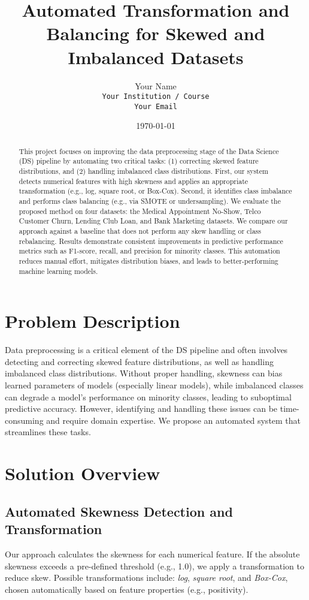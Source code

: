 \documentclass[11pt]{article}
\title{Automated Transformation and Balancing for Skewed and Imbalanced Datasets}
\author{Your Name \\
        \texttt{Your Institution / Course}\\
        \texttt{Your Email}}
\date{\today}
\begin{document}
\maketitle

\begin{abstract}
This project focuses on improving the data preprocessing stage of the Data Science (DS) pipeline by automating two critical tasks: (1) correcting skewed feature distributions, and (2) handling imbalanced class distributions. 
First, our system detects numerical features with high skewness and applies an appropriate transformation (e.g., log, square root, or Box-Cox). 
Second, it identifies class imbalance and performs class balancing (e.g., via SMOTE or undersampling). 
We evaluate the proposed method on four datasets: the Medical Appointment No-Show, Telco Customer Churn, Lending Club Loan, and Bank Marketing datasets. 
We compare our approach against a baseline that does not perform any skew handling or class rebalancing. 
Results demonstrate consistent improvements in predictive performance metrics such as F1-score, recall, and precision for minority classes. 
This automation reduces manual effort, mitigates distribution biases, and leads to better-performing machine learning models.
\end{abstract}

\section{Problem Description}
Data preprocessing is a critical element of the DS pipeline and often involves detecting and correcting skewed feature distributions, as well as handling imbalanced class distributions. 
Without proper handling, skewness can bias learned parameters of models (especially linear models), 
while imbalanced classes can degrade a model’s performance on minority classes, leading to suboptimal predictive accuracy. 
However, identifying and handling these issues can be time-consuming and require domain expertise. 
We propose an automated system that streamlines these tasks.

\section{Solution Overview}
\subsection{Automated Skewness Detection and Transformation}
Our approach calculates the skewness for each numerical feature. 
If the absolute skewness exceeds a pre-defined threshold (e.g., 1.0), 
we apply a transformation to reduce skew. 
Possible transformations include: \textit{log}, \textit{square root}, and \textit{Box-Cox}, 
chosen automatically based on feature properties (e.g., positivity).
\end{document}
